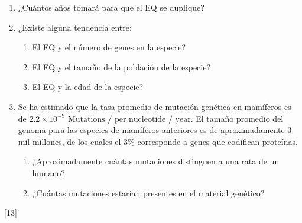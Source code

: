 \documentclass[a4paper]{article}
\newcounter{problema}
\begin{document}
\begin{problema}
\begin{enumerate}
	\item ¿Cuántos años tomará para que el EQ se duplique?

	\item ¿Existe alguna tendencia entre: 
	\begin{enumerate}
		\item El EQ y el número de genes en la especie? 
		\item El EQ y el tamaño de la población de la especie? 
		\item El EQ y la edad de la especie?
	\end{enumerate}

	\item Se ha estimado que la tasa promedio de mutación genética en mamíferos es de $2.2 \times 10^{-9} \text{ Mutations / per nucleotide / year}$. 
	El tamaño promedio del genoma para las especies de mamíferos anteriores es de aproximadamente 3 mil millones, de los cuales el $3\%$ corresponde a genes que codifican proteínas. 
	\begin{enumerate}
		\item  ¿Aproximadamente cuántas mutaciones distinguen a una rata de un humano? 
		\item  ¿Cuántas mutaciones estarían presentes en el material genético?
	\end{enumerate}
\end{enumerate}

        


    
\end{problema}
[13] \cite{NASA_AstrobiologyMath}
\end{document}
